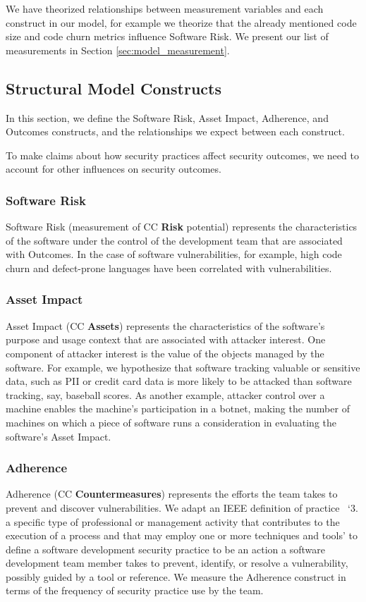 We have theorized relationships between measurement variables and each construct in our model, for example we theorize that the already mentioned code size and code churn metrics influence Software Risk. We present our list of measurements in Section \ref{sec:model_measurement}.

\subsection{Structural Model Constructs}
 \label{sec:model_structual}
In this section, we define the Software Risk, Asset Impact, Adherence, and Outcomes constructs, and the relationships we expect between each construct. 

To make claims about how security practices affect security outcomes, we need to account for other influences on security outcomes.

\subsubsection{Software Risk}
Software Risk (measurement of CC \textbf{Risk} potential) represents the characteristics of the software under the control of the development team that are associated with Outcomes. In the case of software vulnerabilities, for example, high code churn and defect-prone languages have been correlated with vulnerabilities.

\subsubsection{Asset Impact}
Asset Impact (CC \textbf{Assets}) represents the characteristics of the software's purpose and usage context that are associated with attacker interest. One component of attacker interest is the value of the objects managed by the software. For example, we hypothesize that software tracking valuable or sensitive data, such as PII or credit card data is more likely to be attacked than software tracking, say, baseball scores. As another example, attacker control over a machine enables the machine's participation in a botnet, making the number of machines on which a piece of software runs a consideration in evaluating the software's Asset Impact.

\subsubsection{Adherence}
\label{sec:model_contruct_adherence}
Adherence (CC \textbf{Countermeasures}) represents the efforts the team takes to prevent and discover vulnerabilities. We adapt an IEEE definition of practice~\cite{ieee1990glossary} `3. a specific type of professional or management activity that contributes to 
the execution of a process and that may employ one or more techniques and tools' to define a software development security practice to be an action a software development team member takes to prevent, identify, or resolve a vulnerability, possibly guided by a tool or reference. We measure the Adherence construct in terms of the frequency  of security practice use by the team.  

